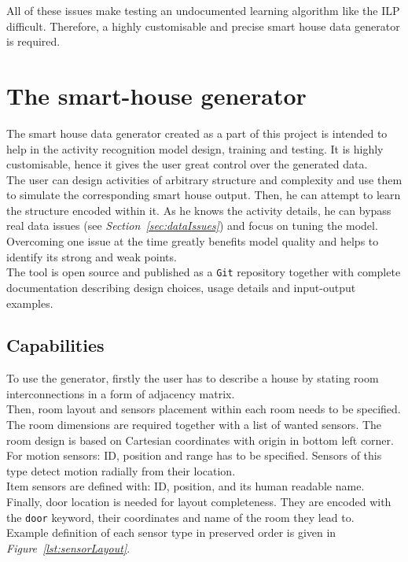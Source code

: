 \documentclass[10pt, a4paper, pdflatex, leqno, twoside, openright]{report}
\begin{document}
All of these issues make testing an undocumented learning algorithm like the ILP difficult. Therefore, a highly customisable and precise smart house data generator is required.

  \section{The smart-house generator}
The smart house data generator created as a part of this project is intended to help in the activity recognition model design, training and testing. It is highly customisable, hence it gives the user great control over the generated data.\\

The user can design activities of arbitrary structure and complexity and use them to simulate the corresponding smart house output. Then, he can attempt to learn the structure encoded within it. As he knows the activity details, he can bypass real data issues (see \emph{Section~\ref{sec:dataIssues}}) and focus on tuning the model. Overcoming one issue at the time greatly benefits model quality and helps to identify its strong and weak points.\\

The tool is open source and published as a \texttt{Git} repository together with complete documentation describing design choices, usage details and input-output examples.

    \subsection{Capabilities}
To use the generator, firstly the user has to describe a house by stating room interconnections in a form of adjacency matrix.\\

Then, room layout and sensors placement within each room needs to be specified. The room dimensions are required together with a list of wanted sensors. The room design is based on Cartesian coordinates with origin in bottom left corner.\\
For motion sensors: ID, position and range has to be specified. Sensors of this type detect motion radially from their location.\\
Item sensors are defined with: ID, position, and its human readable name.\\
Finally, door location is needed for layout completeness. They are encoded with the \texttt{door} keyword, their coordinates and name of the room they lead to.\\
Example definition of each sensor type in preserved order is given in \emph{Figure~\ref{lst:sensorLayout}}.\\
\end{document}
